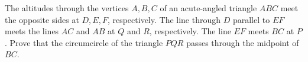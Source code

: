The altitudes through the vertices $A, B, C$ of an acute-angled triangle $ABC$ meet the opposite sides at $D, E, F$, respectively. The line through $D$ parallel to $EF$ meets the lines $AC$ and $AB$ at $Q$ and $R$, respectively. The line $EF$ meets $BC$ at $P$. Prove that the circumcircle of the triangle $PQR$ passes through the midpoint of $BC$.
